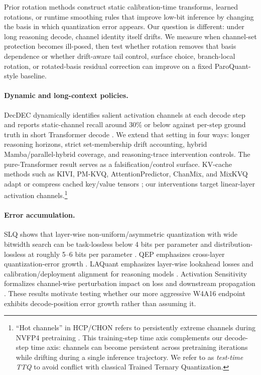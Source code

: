 \documentclass{article}
\begin{document}
Prior rotation methods construct static calibration-time transforms, learned rotations, or runtime smoothing rules that improve low-bit inference by changing the basis in which quantization error appears. Our question is different: under long reasoning decode, channel identity itself drifts. We measure when channel-set protection becomes ill-posed, then test whether rotation removes that basis dependence or whether drift-aware tail control, surface choice, branch-local rotation, or rotated-basis residual correction can improve on a fixed ParoQuant-style baseline.

\paragraph{Dynamic and long-context policies.} DecDEC dynamically identifies salient activation channels at each decode step and reports static-channel recall around 30\% or below against per-step ground truth in short Transformer decode \citep{park2025decdec}. We extend that setting in four ways: longer reasoning horizons, strict set-membership drift accounting, hybrid Mamba/parallel-hybrid coverage, and reasoning-trace intervention controls. The pure-Transformer result serves as a falsification/control surface. KV-cache methods such as KIVI, PM-KVQ, AttentionPredictor, ChanMix, and MixKVQ adapt or compress cached key/value tensors \citep{liu2024kivi,liu2025pmkvq,yang2025attentionpredictor,liao2026chanmix,zhang2025mixkvq}; our interventions target linear-layer activation channels.\footnote{``Hot channels'' in HCP/CHON refers to persistently extreme channels during NVFP4 pretraining \citep{dong2026outlierdynamics}. This training-step time axis complements our decode-step time axis: channels can become persistent across pretraining iterations while drifting during a single inference trajectory. We refer to \citet{koikeakino2026ttq} as \emph{test-time TTQ} to avoid conflict with classical Trained Ternary Quantization.}

\paragraph{Error accumulation.} SLQ shows that layer-wise non-uniform/asymmetric quantization with wide bitwidth search can be task-lossless below 4 bits per parameter and distribution-lossless at roughly 5--6 bits per parameter \citep{helcig2026slq}. QEP emphasizes cross-layer quantization-error growth \citep{arai2025qep}. LAQuant emphasizes layer-wise lookahead losses and calibration/deployment alignment for reasoning models \citep{choi2026laquant}. Activation Sensitivity formalizes channel-wise perturbation impact on loss and downstream propagation \citep{xu2026activationsensitivity}. These results motivate testing whether our more aggressive W4A16 endpoint exhibits decode-position error growth rather than assuming it.
\end{document}
